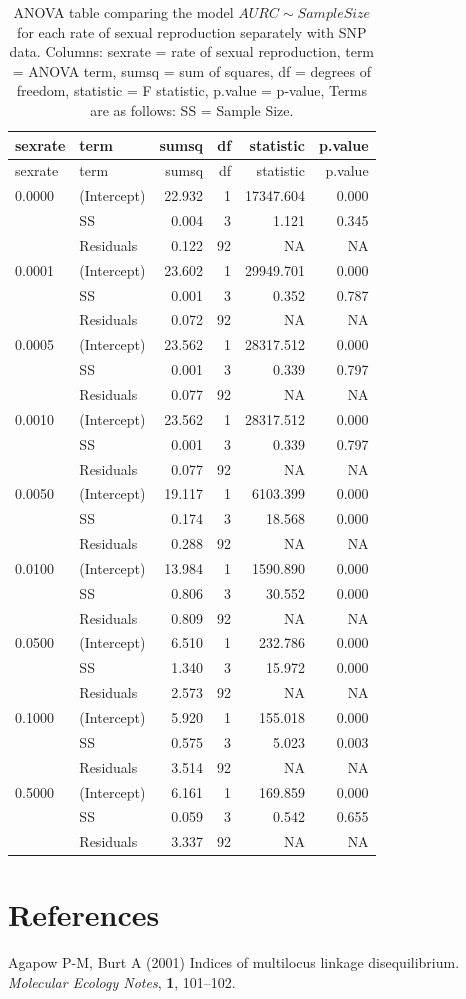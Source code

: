 \documentclass[]{article}
\theoremstyle{definition}
\theoremstyle{definition}
\theoremstyle{remark}
\begin{document}
\begin{longtable}[]{@{}llrrrr@{}}
\caption{\label{tab:sim5} ANOVA table comparing the model
\(AURC \sim Sample Size\) for each rate of sexual reproduction
separately with SNP data. Columns: sexrate = rate of sexual
reproduction, term = ANOVA term, sumsq = sum of squares, df = degrees of
freedom, statistic = F statistic, p.value = p-value, Terms are as
follows: SS = Sample Size.}\tabularnewline
\toprule
sexrate & term & sumsq & df & statistic & p.value\tabularnewline
\midrule
\endfirsthead
\toprule
sexrate & term & sumsq & df & statistic & p.value\tabularnewline
\midrule
\endhead
0.0000 & (Intercept) & 22.932 & 1 & 17347.604 & 0.000\tabularnewline
& SS & 0.004 & 3 & 1.121 & 0.345\tabularnewline
& Residuals & 0.122 & 92 & NA & NA\tabularnewline
0.0001 & (Intercept) & 23.602 & 1 & 29949.701 & 0.000\tabularnewline
& SS & 0.001 & 3 & 0.352 & 0.787\tabularnewline
& Residuals & 0.072 & 92 & NA & NA\tabularnewline
0.0005 & (Intercept) & 23.562 & 1 & 28317.512 & 0.000\tabularnewline
& SS & 0.001 & 3 & 0.339 & 0.797\tabularnewline
& Residuals & 0.077 & 92 & NA & NA\tabularnewline
0.0010 & (Intercept) & 23.562 & 1 & 28317.512 & 0.000\tabularnewline
& SS & 0.001 & 3 & 0.339 & 0.797\tabularnewline
& Residuals & 0.077 & 92 & NA & NA\tabularnewline
0.0050 & (Intercept) & 19.117 & 1 & 6103.399 & 0.000\tabularnewline
& SS & 0.174 & 3 & 18.568 & 0.000\tabularnewline
& Residuals & 0.288 & 92 & NA & NA\tabularnewline
0.0100 & (Intercept) & 13.984 & 1 & 1590.890 & 0.000\tabularnewline
& SS & 0.806 & 3 & 30.552 & 0.000\tabularnewline
& Residuals & 0.809 & 92 & NA & NA\tabularnewline
0.0500 & (Intercept) & 6.510 & 1 & 232.786 & 0.000\tabularnewline
& SS & 1.340 & 3 & 15.972 & 0.000\tabularnewline
& Residuals & 2.573 & 92 & NA & NA\tabularnewline
0.1000 & (Intercept) & 5.920 & 1 & 155.018 & 0.000\tabularnewline
& SS & 0.575 & 3 & 5.023 & 0.003\tabularnewline
& Residuals & 3.514 & 92 & NA & NA\tabularnewline
0.5000 & (Intercept) & 6.161 & 1 & 169.859 & 0.000\tabularnewline
& SS & 0.059 & 3 & 0.542 & 0.655\tabularnewline
& Residuals & 3.337 & 92 & NA & NA\tabularnewline
\bottomrule
\end{longtable}

\section*{References}\label{references}

\hypertarget{refs}{}
\hypertarget{ref-Agapow_2001}{}
Agapow P-M, Burt A (2001) Indices of multilocus linkage disequilibrium.
\emph{Molecular Ecology Notes}, \textbf{1}, 101--102.
\end{document}

